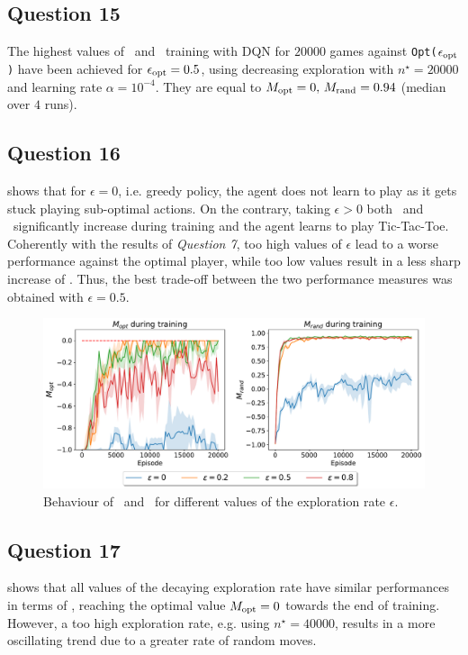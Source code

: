 \documentclass[10pt]{IEEEtran}
\begin{document}
\subsection*{Question 15}
The highest values of \mopt\  and \mrand\  training with DQN for $20000$ games against \texttt{Opt($\epsilon_{\text{opt}}$)} have been achieved for $\epsilon_{\text{opt}} = 0.5$, using decreasing exploration with $n^{\star} = 20000$ and learning rate $\alpha = 10^{-4}$. They are equal to $M_{\text{opt}} = 0, \, M_{\text{rand}} = 0.94$ (median over $4$ runs).

\subsection*{Question 16}
 shows that for $\epsilon = 0$, i.e. greedy policy, the agent does not learn to play as it gets stuck playing sub-optimal actions. On the contrary, taking $\epsilon > 0$ both \mopt\ and \mrand\ significantly increase during training and the agent learns to play Tic-Tac-Toe. Coherently with the results of \emph{Question 7}, too high values of $\epsilon$ lead to a worse performance against the optimal player, while too low values result in a less sharp increase of \mrand. 
Thus, the best trade-off between the two performance measures was obtained with $\epsilon = 0.5$.
\begin{figure}[h]
    \centering
    \includegraphics[width = \linewidth]{code/figures/performance_epsilon_dqn_self.pdf}
    \caption{Behaviour of \mopt\ and \mrand\ for different values of the exploration rate $\epsilon$.}
    \label{plot_question16}
\end{figure}
\subsection*{Question 17}
 shows that all values of the decaying exploration rate have similar performances in terms of \mopt, reaching the optimal value $M_{\text{opt}} = 0$ towards the end of training. However, a too high exploration rate, e.g. using $n^{\star} = 40000$, results in a more oscillating trend due to a greater rate of random moves.
\end{document}
